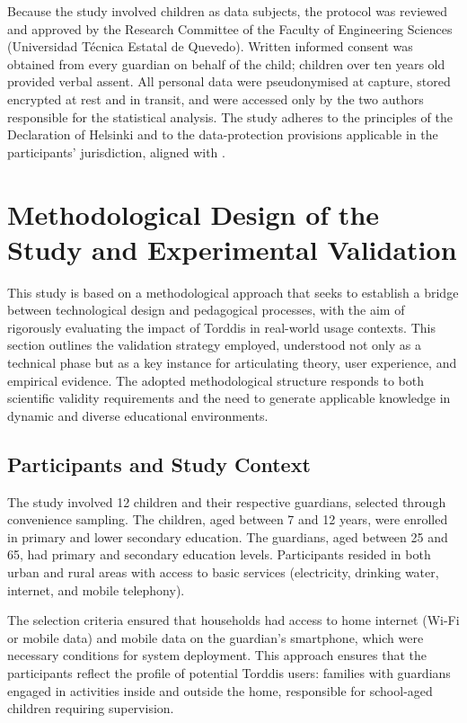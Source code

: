                 Because the study involved children as data subjects, the protocol was reviewed and approved by the Research Committee of the Faculty of Engineering Sciences (Universidad Técnica Estatal de Quevedo). Written informed consent was obtained from every guardian on behalf of the child; children over ten years old provided verbal assent. All personal data were pseudonymised at capture, stored encrypted at rest and in transit, and were accessed only by the two authors responsible for the statistical analysis. The study adheres to the principles of the Declaration of Helsinki and to the data-protection provisions applicable in the participants' jurisdiction, aligned with \citet{ISO-IEC27001-2022}.
                
                \section{Methodological Design of the Study and Experimental Validation}
                \label{section:fifth}
                This study is based on a methodological approach that seeks to establish a bridge between technological design and pedagogical processes, with the aim of rigorously evaluating the impact of Torddis in real-world usage contexts. This section outlines the validation strategy employed, understood not only as a technical phase but as a key instance for articulating theory, user experience, and empirical evidence. The adopted methodological structure responds to both scientific validity requirements and the need to generate applicable knowledge in dynamic and diverse educational environments.
                
                \subsection{Participants and Study Context}
                The study involved 12 children and their respective guardians, selected through convenience sampling. The children, aged between 7 and 12 years, were enrolled in primary and lower secondary education. The guardians, aged between 25 and 65, had primary and secondary education levels. Participants resided in both urban and rural areas with access to basic services (electricity, drinking water, internet, and mobile telephony).
                
                The selection criteria ensured that households had access to home internet (Wi-Fi or mobile data) and mobile data on the guardian’s smartphone, which were necessary conditions for system deployment. This approach ensures that the participants reflect the profile of potential Torddis users: families with guardians engaged in activities inside and outside the home, responsible for school-aged children requiring supervision.
                
